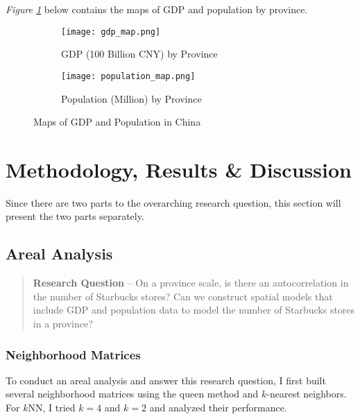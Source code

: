 \documentclass{article}
\begin{document}
\textit{Figure \ref{fig:gdp_population_maps}} below contains the maps of GDP and population by province.

\begin{figure}[htbp]
    \begin{subfigure}[b]{0.48\textwidth}
        \centering
        \texttt{[image: gdp\_map.png]}
        \caption{GDP (100 Billion CNY) by Province}
    \end{subfigure}
    \hfill
    \begin{subfigure}[b]{0.48\textwidth}
        \centering
        \texttt{[image: population\_map.png]}
        \caption{Population (Million) by Province}
    \end{subfigure}
    \caption{Maps of GDP and Population in China}
    \label{fig:gdp_population_maps}
\end{figure}

\section{Methodology, Results \& Discussion}

Since there are two parts to the overarching research question, this section will present the two parts separately.

\subsection{Areal Analysis}

\begin{quote}
    \textbf{Research Question} -- On a province scale, is there an autocorrelation in the number of Starbucks stores? Can we construct spatial models that include GDP and population data to model the number of Starbucks stores in a province?
\end{quote}

\subsubsection{Neighborhood Matrices}

To conduct an areal analysis and answer this research question, I first built several neighborhood matrices using the queen method and \(k\)-nearest neighbors. For \(k\)NN, I tried \(k=4\) and \(k=2\) and analyzed their performance. 
\end{document}
